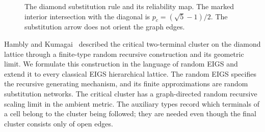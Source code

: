 \documentclass[scheme=plain,11pt]{ctexart}
\theoremstyle{definition}
\theoremstyle{remark}
\begin{document}
\begin{figure}[tbp]
\centering
\begin{minipage}[c]{0.40\textwidth}
\centering
{}
\end{minipage}\hfill
\begin{minipage}[c]{0.55\textwidth}
\centering
{}
\end{minipage}
\caption{The diamond substitution rule and its reliability map. The marked interior intersection with the diagonal is $p_c=(\sqrt5-1)/2$. The substitution arrow does not orient the graph edges.}
\label{fig:dhl-reliability}
\end{figure}















Hambly and Kumagai~\cite{hambly2010diffusion} described the critical two-terminal cluster on the diamond lattice through a finite-type random recursive construction and its geometric limit.
We formulate this construction in the language of random EIGS and extend it to every classical EIGS hierarchical lattice.
The random EIGS specifies the recursive generating mechanism, and its finite approximations are random substitution networks. The critical cluster has a graph-directed random recursive scaling limit in the ambient metric.
The auxiliary types record which terminals of a cell belong to the cluster being followed; they are needed even though the final cluster consists only of open edges.
\end{document}
